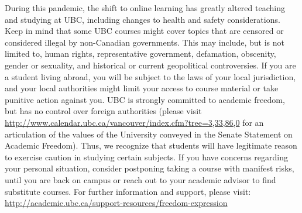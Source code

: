 \documentclass[
]{article}
\begin{document}
During this pandemic, the shift to online learning has greatly altered
teaching and studying at UBC, including changes to health and safety
considerations. Keep in mind that some UBC courses might cover topics
that are censored or considered illegal by non-Canadian governments.
This may include, but is not limited to, human rights, representative
government, defamation, obscenity, gender or sexuality, and historical
or current geopolitical controversies. If you are a student living
abroad, you will be subject to the laws of your local jurisdiction, and
your local authorities might limit your access to course material or
take punitive action against you. UBC is strongly committed to academic
freedom, but has no control over foreign authorities (please visit
\url{http://www.calendar.ubc.ca/vancouver/index.cfm?tree=3,33,86,0} for
an articulation of the values of the University conveyed in the Senate
Statement on Academic Freedom). Thus, we recognize that students will
have legitimate reason to exercise caution in studying certain subjects.
If you have concerns regarding your personal situation, consider
postponing taking a course with manifest risks, until you are back on
campus or reach out to your academic advisor to find substitute courses.
For further information and support, please visit:
\url{http://academic.ubc.ca/support-resources/freedom-expression}
\end{document}
